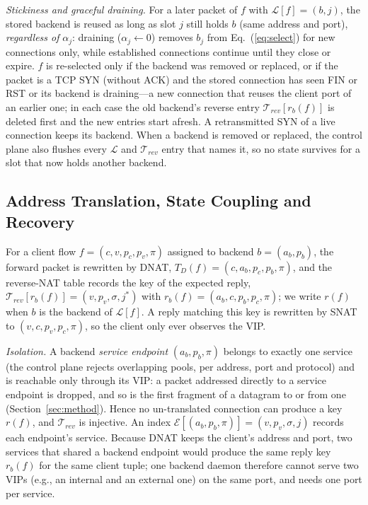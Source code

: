 \documentclass[conference]{IEEEtran}
\begin{document}
\textit{Stickiness and graceful draining.} For a later packet of $f$ with
$\mathcal{L}[f]=(b,j)$, the stored backend is reused as long as slot $j$ still
holds $b$ (same address and port), \emph{regardless of} $\alpha_j$: draining
($\alpha_j \gets 0$) removes $b_j$ from Eq.~(\ref{eq:select}) for new
connections only, while established connections continue until they close or
expire. $f$ is re-selected only if the backend was removed or replaced, or if
the packet is a TCP SYN (without ACK) and the stored connection has seen FIN or
RST or its backend is draining---a new connection that reuses the client port
of an earlier one; in each case the old backend's reverse entry
$\mathcal{T}_{rev}[r_{b}(f)]$ is deleted first and the new entries start
afresh. A retransmitted SYN of a live connection keeps its backend.
When a backend is removed or replaced, the control plane also flushes every
$\mathcal{L}$ and $\mathcal{T}_{rev}$ entry that names it, so no state
survives for a slot that now holds another backend.

\subsection{Address Translation, State Coupling and Recovery}
\label{sec:coupling}
For a client flow $f=(c,v,p_c,p_v,\pi)$ assigned to backend $b=(a_b,p_b)$, the
forward packet is rewritten by DNAT, $T_D(f)=(c,a_b,p_c,p_b,\pi)$, and the
reverse-NAT table records the key of the expected reply,
$\mathcal{T}_{rev}[r_b(f)] = (v,p_v,\sigma,j^*)$ with
$r_b(f)=(a_b,c,p_b,p_c,\pi)$; we write $r(f)$ when $b$ is the backend of
$\mathcal{L}[f]$. A reply matching this key is rewritten by SNAT to
$(v,c,p_v,p_c,\pi)$, so the client only ever observes the VIP.

\textit{Isolation.} A backend \emph{service endpoint} $(a_b,p_b,\pi)$ belongs
to exactly one service (the control plane rejects overlapping pools, per
address, port and protocol) and is reachable only through its VIP: a packet
addressed directly to a service endpoint is dropped, and so is the first
fragment of a datagram to or from one (Section~\ref{sec:method}). Hence no un-translated
connection can produce a key $r(f)$, and $\mathcal{T}_{rev}$ is injective. An
index $\mathcal{E}[(a_b,p_b,\pi)] = (v,p_v,\sigma,j)$ records each endpoint's
service. Because DNAT keeps the client's address and port, two services that
shared a backend endpoint would produce the same reply key $r_b(f)$ for the
same client tuple; one backend daemon therefore cannot serve two VIPs (e.g.,
an internal and an external one) on the same port, and needs one port per
service.
\end{document}
